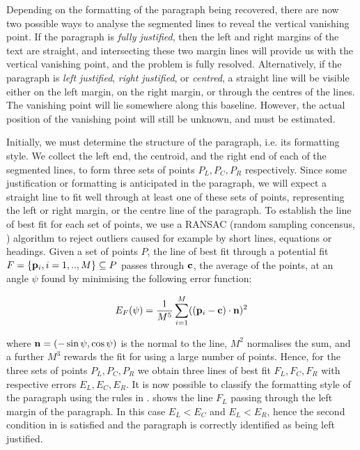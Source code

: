 Depending on the formatting of the paragraph being recovered, there are now two
possible ways to analyse the segmented lines to reveal the vertical vanishing
point.  If the paragraph is {\em fully justified}, then the left and right
margins of the text are straight, and intersecting these two margin lines will
provide us with the vertical vanishing point, and the problem is fully resolved.
Alternatively, if the paragraph is {\em left justified}, {\em right justified},
or {\em centred},
a straight line will be visible either on the left margin, on the right margin,
or through the centres of the lines.  The vanishing point will lie somewhere
along this baseline.  However, the actual position of the vanishing point will
still be unknown, and must be estimated.


Initially, we must determine the structure of the paragraph, i.e. its 
formatting style. We collect the left end, the centroid, and the right end of each
of the segmented lines, to form three sets of points $P_L,P_C,P_R$ respectively.
Since some justification or formatting is anticipated in the paragraph, we will
expect a straight line to fit well through at least one of these sets of points,
representing the left or right margin, or the centre line of the paragraph.  To
establish the line of best fit for each set of points, we use a RANSAC (random
sampling concensus, \cite{bolles81ransac-based}) algorithm to reject outliers
caused for example by short lines, equations or headings.  Given a set of points
$P$, the line of best fit through a potential fit 
$F=\{{ \bf p }_i, i=1,..,M\}\subseteq P$ passes through ${ \bf c }$, the average
of the points, at an angle $\psi$ found by minimising the following error function:

\begin{equation}
E_F(\psi) = \frac{1}{M^5} \sum_{i=1}^{M} ( ({ \bf p }_i-{ \bf c }) \cdot { \bf n })^2
\label{ransacerroreqn}
\end{equation}

{\parindent 0mm
where ${ \bf n }=(-\sin \psi,\cos \psi)$ is the normal to the line, $M^{2}$
normalises the sum, and a further $M^{3}$ rewards the fit for using a large
number of points. Hence, for the three sets of points $P_L,P_C,P_R$ we obtain
three lines of best fit $F_L,F_C,F_R$ with respective errors
$E_L,E_C,E_R$.  It is now possible to classify the formatting style of the
paragraph using the rules in .  
shows the line $F_L$ passing through the left margin of the paragraph.  In this
case $E_L<E_C$ and $E_L<E_R$, hence the second condition in
 is satisfied and the paragraph is correctly identified
as being left justified.
}

